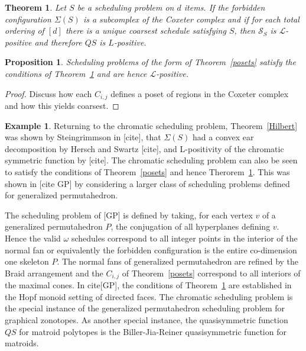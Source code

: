 \documentclass[12pt,reqno]{amsart}
\numberwithin{definition}{section}
\newtheorem{proposition}[definition]{Proposition}
\newtheorem{theorem}[definition]{Theorem}
\theoremstyle{definition}
\newtheorem{example}[definition]{Example}
\newcommand{\SSS}{\mathcal{S}}
\newcommand{\ncL}{\mathcal{L}}
\begin{document}

\begin{theorem} \label{unique} Let $S$ be a scheduling problem on $d$ items.  If the forbidden configuration $\Sigma(S)$ is a subcomplex of the Coxeter complex and if for each total ordering of $[d]$ there is a unique coarsest schedule satisfying $S$, then $\SSS_S$ is $\ncL$-positive and therefore $QS$ is $L$-positive. 
\end{theorem}


\begin{proposition}
Scheduling problems of the form of Theorem~\ref{posets} satisfy the conditions of Theorem~\ref{unique} and are hence $\ncL$-positive.
\end{proposition}

\begin{proof}
Discuss how each $C_{i,j}$ defines a poset of regions in the Coxeter complex and how this yields coarsest.
\end{proof}

\begin{example}
Returning to the chromatic scheduling problem, Theorem~\ref{Hilbert}
was shown by Steingrimmson in [cite], that $\Sigma(S)$ had a convex
ear decomposition by Hersch and Swartz [cite], and L-positivity of the
chromatic symmetric function by [cite].  The chromatic scheduling
problem can also be seen to satisfy the conditions of
Theorem~\ref{posets} and hence Therorem~\ref{unique}.  This was shown
in [cite GP] by considering a larger class of scheduling problems
defined for generalized permutahedron.  

The scheduling problem of [GP] is defined by taking, for each vertex
$v$ of a generalized permutahedron $P$, the conjugation of all
hyperplanes defining $v$.  Hence the valid $\omega$ schedules
correspond to all integer points in the interior of the normal fan or
equivalently the forbidden configuration is the entire co-dimension
one skeleton $P$.  The normal fans of generalized permutahedron are
refined by the Braid arrangement and the $C_{i,j}$ of
Theorem~\ref{posets} correspond to all interiors of the maximal cones.
In cite[GP], the conditions of Theorem~\ref{unique} are established in
the Hopf monoid setting of directed faces.  The chromatic scheduling
problem is the special instance of the generalized permutahedron
scheduling problem for graphical zonotopes.  As another special
instance, the quasisymmetric function $QS$ for matroid polytopes is
the Biller-Jia-Reiner quasisymmetric function for matroids.
\end{example}
\end{document}
